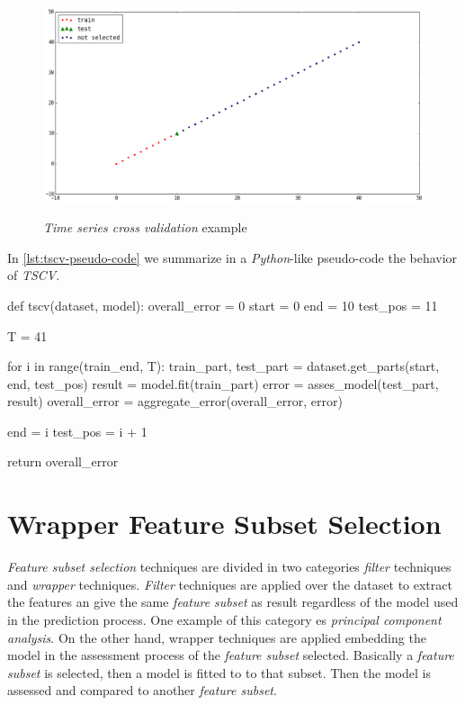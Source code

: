 \begin{figure}[bth]
  \myfloatalign
  {\includegraphics[width=1\linewidth]
    {gfx/tscv-example}}
  \caption{\textit{Time series cross validation} example}
  \label{fig:tscv-example}
\end{figure}

In \autoref{lst:tscv-pseudo-code} we summarize in a
\textit{Python}-like pseudo-code the behavior of \textit{TSCV}.

\begin{code}[language = Python, frame = single,
  caption = {\textit{TSCV} pseudo code},
  label = lst:tscv-pseudo-code,
  captionpos = b][bth]
def tscv(dataset, model):
  overall_error = 0
  start = 0
  end = 10 
  test_pos = 11

  T = 41

  for i in range(train_end, T):
    train_part, test_part = dataset.get_parts(start, end,
                                              test_pos)
    result = model.fit(train_part)
    error = asses_model(test_part, result)
    overall_error = aggregate_error(overall_error, error)

    end = i
    test_pos = i + 1

  return overall_error
\end{code}

\chapter{Wrapper Feature Subset Selection}
\label{ch:wfss}

\textit{Feature subset selection} techniques are divided in two
categories \textit{filter} techniques and \textit{wrapper} techniques.
\textit{Filter} techniques are applied over the dataset to extract the
features an give the same \textit{feature subset} as result regardless
of the model used in the prediction process. One example of this
category es \textit{principal component analysis}. On the other hand,
wrapper techniques are applied embedding the model in the assessment
process of the \textit{feature subset} selected. Basically a
\textit{feature subset} is selected, then a model is fitted to to that
subset. Then the model is assessed and compared to another
\textit{feature subset}.

